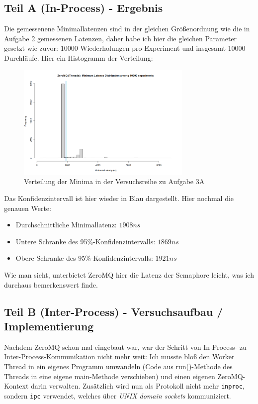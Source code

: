 \documentclass[12pt]{article}
\begin{document}
\subsection{Teil A (In-Process) - Ergebnis}
Die gemessenene Minimallatenzen sind in der gleichen Größenordnung wie die in Aufgabe 2 gemessenen Latenzen, daher habe ich hier die gleichen Parameter gesetzt wie zuvor: 10000 Wiederholungen pro Experiment und insgesamt 10000 Durchläufe. Hier ein Histogramm der Verteilung:

\begin{figure}[H]
	\centering
	\includegraphics[width=0.75\textwidth]{./img/zeromq_inproc}
	\caption{Verteilung der Minima in der Versuchsreihe zu Aufgabe 3A}
	\label{img:zeromq:inproc}
\end{figure}

Das Konfidenzintervall ist hier wieder in Blau dargestellt.
Hier nochmal die genauen Werte:
\begin{itemize}
	\item Durchschnittliche Minimallatenz: $1908 ns$
	\item Untere Schranke des 95\%-Konfidenzintervalls: $1869 ns$
	\item Obere Schranke des 95\%-Konfidenzintervalls: $1921 ns$
\end{itemize}

Wie man sieht, unterbietet ZeroMQ hier die Latenz der Semaphore leicht, was ich durchaus bemerkenswert finde.

\subsection{Teil B (Inter-Process) - Versuchsaufbau / Implementierung}
Nachdem ZeroMQ schon mal eingebaut war, war der Schritt von In-Process- zu Inter-Process-Kommunikation nicht mehr weit:
Ich musste bloß den Worker Thread in ein eigenes Programm umwandeln (Code aus run()-Methode des Threads in eine eigene main-Methode verschieben) und einen eigenen ZeroMQ-Kontext darin verwalten.
Zusätzlich wird nun als Protokoll nicht mehr \texttt{inproc}, sondern \texttt{ipc} verwendet, welches über \emph{UNIX domain sockets} kommuniziert.
\end{document}
